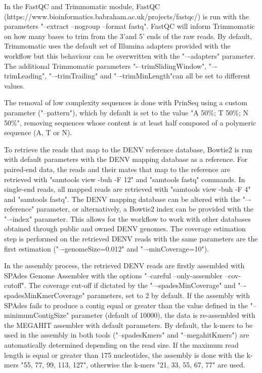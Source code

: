 In the FastQC and Trimmomatic module, FastQC (https://www.bioinformatics.babraham.ac.uk/projects/fastqc/) is run with the parameters "–extract –nogroup –format fastq". FastQC will inform Trimmomatic \citep{bolger_trimmomatic_2014} on how many bases to trim from the 3’and 5’ ends of the raw reads. By default, Trimmomatic uses the default set of Illumina adapters provided with the workflow but this behaviour can be overwritten with the "–-adapters" parameter. The additional Trimmomatic parameters "-–trimSlidingWindow", "–-trimLeading", "–-trimTrailing" and "–-trimMinLength"can all be set to different values.

The removal of low complexity sequences is done with PrinSeq \citep{schmieder_quality_2011} using a custom parameter ("–pattern"), which by default is set to the value "A 50\%; T 50\%; N 50\%", removing sequences whose content is at least half composed of a polymeric sequence (A, T or N).

To retrieve the reads that map to the DENV reference database, Bowtie2 \citep{langmead_fast_2012} is run with default parameters with the DENV mapping database as a reference. For paired-end data, the reads and their mates that map to the reference are retrieved with "samtools view -buh -F 12" and "samtools fastq" commands. In single-end reads, all mapped reads are retrieved with "samtools view -buh -F 4" and "samtools fastq". The DENV mapping database can be altered with the "–-reference" parameter, or alternatively, a Bowtie2 index can be provided with the "–-index" parameter. This allows for the workflow to work with other databases obtained through public and owned DENV genomes. The coverage estimation step is performed on the retrieved DENV reads with the same parameters are the first estimation ("–-genomeSize=0.012" and "–-minCoverage=10").

In the assembly process, the retrieved DENV reads are firstly assembled with SPAdes Genome Assembler \citep{bankevich_spades_2012} with the options "–careful –only-assembler –cov-cutoff". The coverage cut-off if dictated by the "–-spadesMinCoverage" and "–-spadesMinKmerCoverage" parameters, set to 2 by default. If the assembly with SPAdes fails to produce a contig equal or greater than the value defined in the "–minimumContigSize" parameter (default of 10000), the data is re-assembled with the MEGAHIT assembler \citep{li_megahit_2015} with default parameters. By default, the k-mers to be used in the assembly in both tools ("–spadesKmers" and "–megahitKmers") are automatically determined depending on the read size. If the maximum read length is equal or greater than 175 nucleotides, the assembly is done with the k-mers "55, 77, 99, 113, 127", otherwise the k-mers "21, 33, 55, 67, 77" are used.


